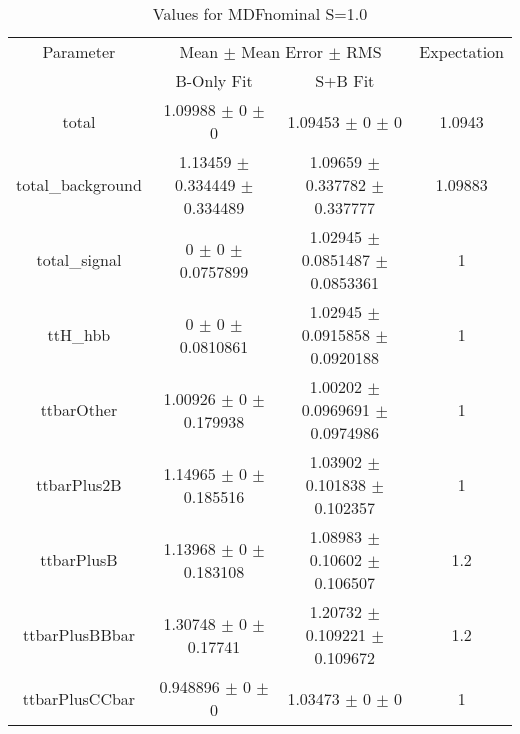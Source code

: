 \begin{table}
\centering
\caption{Values for MDFnominal S=1.0}
\begin{tabular}{cccc}
\toprule
Parameter & \multicolumn{2}{c}{Mean $\pm$ Mean Error $\pm$ RMS} & Expectation\\
 & B-Only Fit & S+B Fit & \\
\midrule
total & \num{1.09988} $\pm$ \num{0} $\pm$ \num{0} & \num{1.09453} $\pm$ \num{0} $\pm$ \num{0} & \num{1.0943}\\
total\_background & \num{1.13459} $\pm$ \num{0.334449} $\pm$ \num{0.334489} & \num{1.09659} $\pm$ \num{0.337782} $\pm$ \num{0.337777} & \num{1.09883}\\
total\_signal & \num{0} $\pm$ \num{0} $\pm$ \num{0.0757899} & \num{1.02945} $\pm$ \num{0.0851487} $\pm$ \num{0.0853361} & \num{1}\\
ttH\_hbb & \num{0} $\pm$ \num{0} $\pm$ \num{0.0810861} & \num{1.02945} $\pm$ \num{0.0915858} $\pm$ \num{0.0920188} & \num{1}\\
ttbarOther & \num{1.00926} $\pm$ \num{0} $\pm$ \num{0.179938} & \num{1.00202} $\pm$ \num{0.0969691} $\pm$ \num{0.0974986} & \num{1}\\
ttbarPlus2B & \num{1.14965} $\pm$ \num{0} $\pm$ \num{0.185516} & \num{1.03902} $\pm$ \num{0.101838} $\pm$ \num{0.102357} & \num{1}\\
ttbarPlusB & \num{1.13968} $\pm$ \num{0} $\pm$ \num{0.183108} & \num{1.08983} $\pm$ \num{0.10602} $\pm$ \num{0.106507} & \num{1.2}\\
ttbarPlusBBbar & \num{1.30748} $\pm$ \num{0} $\pm$ \num{0.17741} & \num{1.20732} $\pm$ \num{0.109221} $\pm$ \num{0.109672} & \num{1.2}\\
ttbarPlusCCbar & \num{0.948896} $\pm$ \num{0} $\pm$ \num{0} & \num{1.03473} $\pm$ \num{0} $\pm$ \num{0} & \num{1}\\
\bottomrule
\end{tabular}
\end{table}